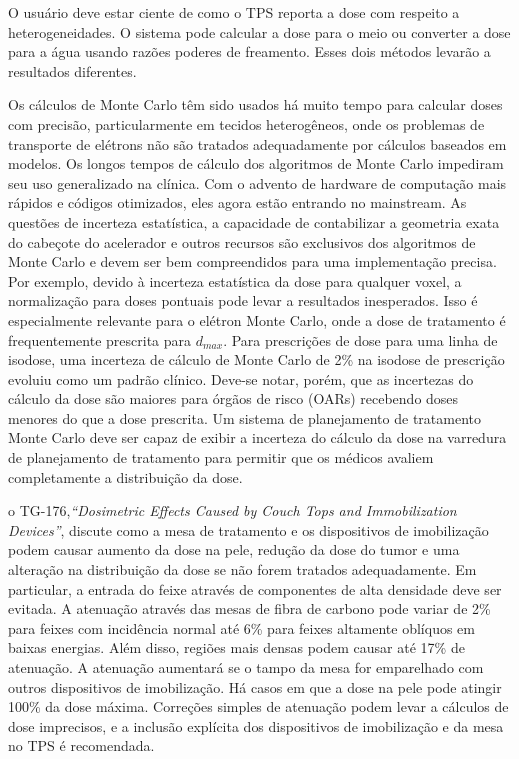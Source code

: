 \documentclass[11pt,a4paper]{article}
\newcounter{exemplo}
\begin{document}
	O usuário deve estar ciente de como o TPS reporta a dose com respeito a heterogeneidades. O sistema pode calcular a dose para o meio ou converter a dose para a água usando razões poderes de freamento. Esses dois métodos levarão a resultados diferentes. 

	Os cálculos de Monte Carlo têm sido usados há muito tempo para calcular doses com precisão, particularmente em tecidos heterogêneos, onde os problemas de transporte de elétrons não são tratados adequadamente por cálculos baseados em modelos. Os longos tempos de cálculo dos algoritmos de Monte Carlo impediram seu uso generalizado na clínica. Com o advento de hardware de computação mais rápidos e códigos otimizados, eles agora estão entrando no mainstream. As questões de incerteza estatística, a capacidade de contabilizar a geometria exata do cabeçote do acelerador e outros recursos são exclusivos dos algoritmos de Monte Carlo e devem ser bem compreendidos para uma implementação precisa. Por exemplo, devido à incerteza estatística da dose para qualquer voxel, a normalização para doses pontuais pode levar a resultados inesperados. Isso é especialmente relevante para o elétron Monte Carlo, onde a dose de tratamento é frequentemente prescrita para $d_{max}$. Para prescrições de dose para uma linha de isodose, uma incerteza de cálculo de Monte Carlo de 2\% na isodose de prescrição evoluiu como um padrão clínico. Deve-se notar, porém, que as incertezas do cálculo da dose são maiores para órgãos de risco (OARs) recebendo doses menores do que a dose prescrita. Um sistema de planejamento de tratamento Monte Carlo deve ser capaz de exibir a incerteza do cálculo da dose na varredura de planejamento de tratamento para permitir que os médicos avaliem completamente a distribuição da dose.

	o TG-176,\textit{``Dosimetric Effects Caused by Couch Tops and Immobilization Devices''}, discute como a mesa de tratamento e os dispositivos de imobilização podem causar aumento da dose na pele, redução da dose do tumor e uma alteração na distribuição da dose se não forem tratados adequadamente. Em particular, a entrada do feixe através de componentes de alta densidade deve ser evitada. A atenuação através das mesas de fibra de carbono pode variar de 2\% para feixes com incidência normal até 6\% para feixes altamente oblíquos em baixas energias. Além disso, regiões mais densas podem causar até 17\% de atenuação. A atenuação aumentará se o tampo da mesa for emparelhado com outros dispositivos de imobilização. Há casos em que a dose na pele pode atingir 100\% da dose máxima. Correções simples de atenuação podem levar a cálculos de dose imprecisos, e a inclusão explícita dos dispositivos de imobilização e da mesa no TPS é recomendada.
\end{document}
